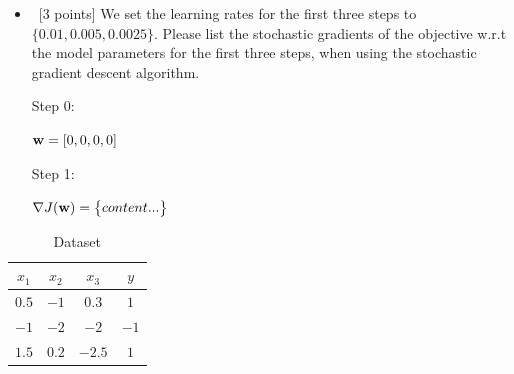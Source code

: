\documentclass[12pt, fullpage,letterpaper]{article}
\begin{document}
\begin{enumerate}
\begin{itemize}
		\bigskip
		
		\item~[3 points] We set the learning rates for the first three steps to $\{0.01, 0.005, 0.0025\}$.  Please list the stochastic gradients of the objective w.r.t the model parameters for the first three steps, when using the stochastic gradient descent algorithm. 
		
		Step 0:
		
		${\bf w} = [0, 0, 0, 0]$
		
		Step 1:
		
		$\nabla J({\bf w}) = 
		\begin{Bmatrix}
		content...
		\end{Bmatrix}$
		
		
		
	\end{itemize}
	\begin{table}[h]
		\centering
		\begin{tabular}{ccc|c}
			$x_1$ & $x_2$ & $x_3$ &  $y$\\ 
			\hline\hline
			$0.5$ & $-1$ & $0.3$ & $1$ \\ \hline
			$-1$ & $-2$ & $-2$ & $-1$\\ \hline
			$1.5$ & $0.2$ & $-2.5$ & $1$\\ \hline
		\end{tabular}
	\caption{Dataset} 
	\label{tb:dt}
	\end{table}

	
\end{enumerate}
\end{document}
